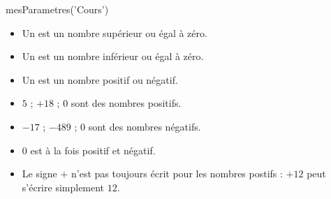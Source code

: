 \documentclass[../Chapitre2.tex]{subfiles}
\begin{document}

\begin{luacode}
  mesParametres('Cours')
\end{luacode}
\parametrage





\begin{definition}[Définitions]

\begin{itemize}
  \item Un  est un nombre supérieur ou égal à zéro.
  \item Un  est un nombre inférieur ou égal à zéro.
  \item Un  est un nombre positif ou négatif.
\end{itemize}

\end{definition}


\begin{exemple}
    \begin{itemize}
      \item $5$ ; $+18$ ; $0$ sont des nombres positifs.
      \item $-17$ ; $-489$ ; $0$ sont des nombres négatifs.
    \end{itemize}
\end{exemple}


\begin{remarque}[Remarques]
  \begin{itemize}
    \item $0$ est à la fois positif et négatif.
    \item Le signe $+$ n'est pas toujours écrit pour les nombres postifs : $+12$ peut s'écrire simplement $12$.
  \end{itemize}
\end{remarque}


\end{document}
